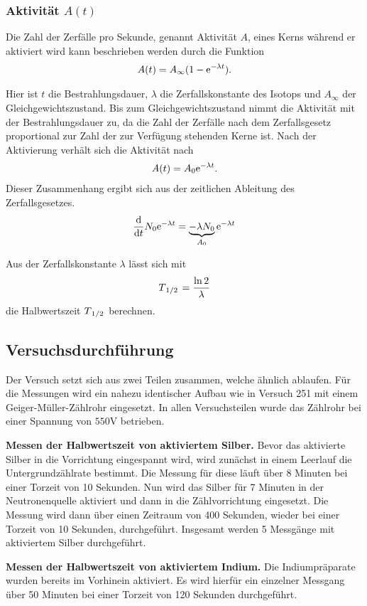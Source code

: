 \subsubsection*{Aktivität $A(t)$}

Die Zahl der Zerfälle pro Sekunde, genannt Aktivität $A$, eines Kerns während er aktiviert wird kann beschrieben werden durch die Funktion
\begin{align}
  A(t) = A_{\infty}(1- \text{e}^{-\lambda t}).
\end{align}

Hier ist $t$ die Bestrahlungsdauer, $\lambda$ die Zerfallskonstante des Isotops und $A_{\infty}$ der Gleichgewichtszustand. Bis zum Gleichgewichtszustand nimmt die Aktivität mit der Bestrahlungsdauer zu, da die Zahl der Zerfälle nach dem Zerfallsgesetz proportional zur Zahl der zur Verfügung stehenden Kerne ist. Nach der Aktivierung verhält sich die Aktivität nach
\begin{align}
  A(t) = A_0\text{e}^{-\lambda t}.
\end{align}
Dieser Zusammenhang ergibt sich aus der zeitlichen Ableitung des Zerfallsgesetzes.
\begin{align}
  \dv{t} N_0\text{e}^{-\lambda t} = \underbrace{-\lambda N_0}_{A_0}\text{e}^{-\lambda t}
\end{align}

Aus der Zerfallskonstante $\lambda$ lässt sich mit
\begin{align}
  T_{\flatfrac{1}{2}} = \frac{\ln 2}{\lambda}
\end{align}
die Halbwertszeit $T_{\flatfrac{1}{2}}$ berechnen.

\subsection{Versuchsdurchführung}

Der Versuch setzt sich aus zwei Teilen zusammen, welche ähnlich ablaufen. Für die Messungen wird ein nahezu identischer Aufbau wie in Versuch 251 mit einem Geiger-Müller-Zählrohr eingesetzt. In allen Versuchsteilen wurde das Zählrohr bei einer Spannung von $550\si{\volt}$ betrieben.

\textbf{Messen der Halbwertszeit von aktiviertem Silber.} Bevor das aktivierte Silber in die Vorrichtung eingespannt wird, wird zunächst in einem Leerlauf die Untergrundzählrate bestimmt. Die Messung für diese läuft über 8 Minuten bei einer Torzeit von 10 Sekunden. Nun wird das Silber für 7 Minuten in der Neutronenquelle aktiviert und dann in die Zählvorrichtung eingesetzt. Die Messung wird dann über einen Zeitraum von 400 Sekunden, wieder bei einer Torzeit von 10 Sekunden, durchgeführt. Insgesamt werden 5 Messgänge mit aktiviertem Silber durchgeführt. 

\textbf{Messen der Halbwertszeit von aktiviertem Indium.} Die Indiumpräparate wurden bereits im Vorhinein aktiviert. Es wird hierfür ein einzelner Messgang über 50 Minuten bei einer Torzeit von 120 Sekunden durchgeführt.